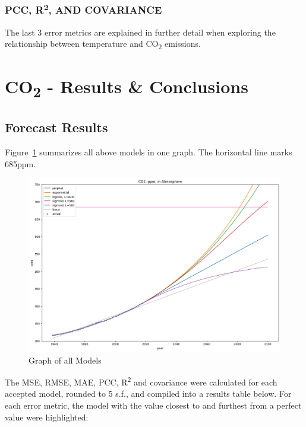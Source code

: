 \documentclass[12pt]{mcmthesis}
\begin{document}
    \subsubsection*{PCC, R\textsuperscript{2}, AND COVARIANCE}
    The last 3 error metrics are explained in further detail when exploring the relationship between temperature and CO\textsubscript{2} emissions.



    \section{CO\textsubscript{2} - Results \& Conclusions}

    \subsection{Forecast Results}

    Figure~\ref{fig:co2_all} summarizes all above models in one graph.
    The horizontal line marks 685\si{ppm}.

    \begin{figure}[h]
        \centering
        \includegraphics[width=\linewidth]{co2_pred_all}
        \caption{Graph of all Models}
        \label{fig:co2_all}
    \end{figure}


    The MSE, RMSE, MAE, PCC, R\textsuperscript{2} and covariance were calculated for each accepted model, rounded to 5 s.f., and compiled into a results table below. For each error metric, the model with the value closest to and furthest from a perfect value were highlighted:
\end{document}
